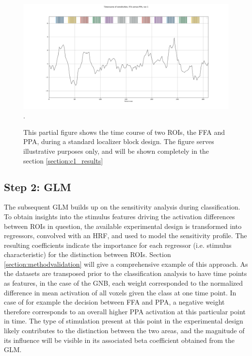 \documentclass[a4paper, 12pt]{scrreprt}
\begin{document}
\begin{figure}
	\includegraphics[scale = 0.37]{img/tc_loc_onlysens.png}.
	\caption[Examplary time course of sensitivities]{\small{This partial figure shows the time course of two ROIs, the FFA and PPA, during a standard localizer block design. The figure serves illustrative purposes only, and will be shown completely in the section \ref{section:c1_results}}}
	\label{fig:tc}
\end{figure}

\subsection{Step 2: GLM}

The subsequent GLM builds up on the sensitivity analysis during classification. To obtain insights into the stimulus features driving the activation differences between ROIs in question, the available experimental design is transformed into regressors, convolved with an HRF, and used to model the sensitivity profile. The resulting coefficients indicate the importance for each regressor (i.e. stimulus characteristic) for the distinction between ROIs. Section \ref{section:methodvalidation} will give a comprehensive example of this approach. As the datasets are transposed prior to the classification analysis to have time points as features, in the case of the GNB, each weight corresponded to the normalized difference in mean activation of all voxels given the class at one time point. In case of for example the decision between FFA and PPA, a negative weight therefore corresponds to an overall higher PPA activation at this particular point in time. The type of stimulation present at this point in the experimental design likely contributes to the distinction between the two areas, and the magnitude of its influence will be visible in its associated beta coefficient obtained from the GLM.
	
\end{document}
